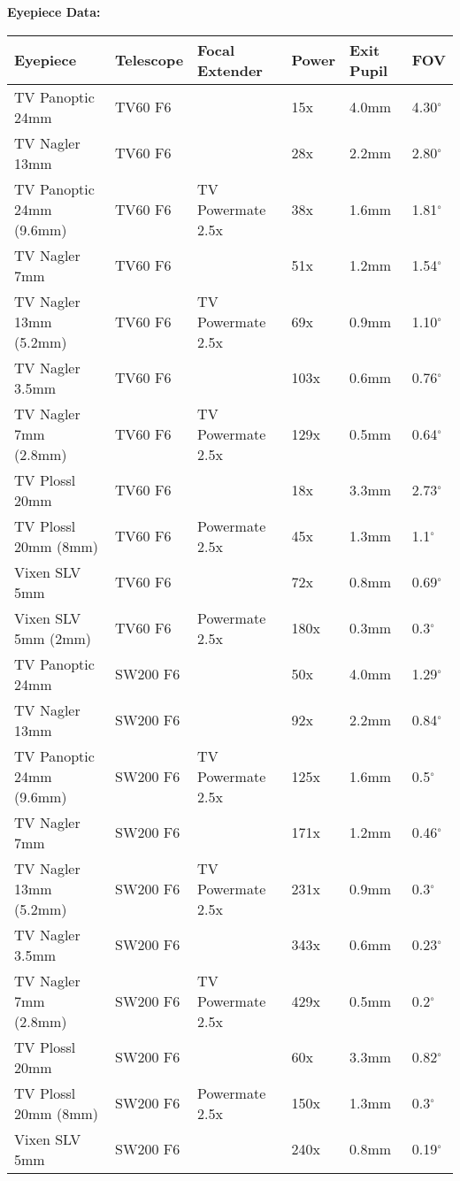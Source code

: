 \newpage
{\bf Eyepiece Data:}
\begin{longtable}{@{}llllll@{}}
\hline
{\bf Eyepiece} & {\bf Telescope} & {\bf Focal Extender} & {\bf Power} & {\bf Exit Pupil} & {\bf FOV}\\
\hline
TV Panoptic 24mm & TV60 F6 & & 15x & 4.0mm & 4.30$^{\circ}$ \\
TV Nagler 13mm & TV60 F6 & & 28x & 2.2mm & 2.80$^{\circ}$ \\
TV Panoptic 24mm (9.6mm)& TV60 F6 & TV Powermate 2.5x & 38x & 1.6mm & 1.81$^{\circ}$ \\
TV Nagler 7mm & TV60 F6 & & 51x & 1.2mm & 1.54$^{\circ}$ \\
TV Nagler 13mm (5.2mm)& TV60 F6 & TV Powermate 2.5x & 69x & 0.9mm & 1.10$^{\circ}$ \\
TV Nagler 3.5mm & TV60 F6 & & 103x & 0.6mm & 0.76$^{\circ}$ \\
TV Nagler 7mm (2.8mm)& TV60 F6 & TV Powermate 2.5x & 129x & 0.5mm & 0.64$^{\circ}$ \\
\hline
TV Plossl 20mm & TV60 F6 & & 18x & 3.3mm & 2.73$^{\circ}$ \\
TV Plossl 20mm (8mm) & TV60 F6 & Powermate 2.5x & 45x & 1.3mm & 1.1$^{\circ}$ \\
Vixen SLV 5mm & TV60 F6 & & 72x & 0.8mm & 0.69$^{\circ}$ \\
Vixen SLV 5mm (2mm) & TV60 F6 & Powermate 2.5x & 180x & 0.3mm & 0.3$^{\circ}$ \\
\hline
TV Panoptic 24mm & SW200 F6 & & 50x & 4.0mm & 1.29$^{\circ}$ \\
TV Nagler 13mm & SW200 F6 & & 92x & 2.2mm & 0.84$^{\circ}$ \\
TV Panoptic 24mm (9.6mm)& SW200 F6 & TV Powermate 2.5x & 125x & 1.6mm & 0.5$^{\circ}$ \\
TV Nagler 7mm & SW200 F6 & & 171x & 1.2mm & 0.46$^{\circ}$ \\
TV Nagler 13mm (5.2mm)& SW200 F6 & TV Powermate 2.5x & 231x & 0.9mm & 0.3$^{\circ}$ \\
TV Nagler 3.5mm & SW200 F6 & & 343x & 0.6mm & 0.23$^{\circ}$ \\
TV Nagler 7mm (2.8mm)& SW200 F6 & TV Powermate 2.5x & 429x & 0.5mm & 0.2$^{\circ}$ \\
\hline
TV Plossl 20mm & SW200 F6 & & 60x & 3.3mm & 0.82$^{\circ}$ \\
TV Plossl 20mm (8mm) & SW200 F6 & Powermate 2.5x & 150x & 1.3mm & 0.3$^{\circ}$ \\
Vixen SLV 5mm & SW200 F6 & & 240x & 0.8mm & 0.19$^{\circ}$ \\
\hline
\end{longtable}
